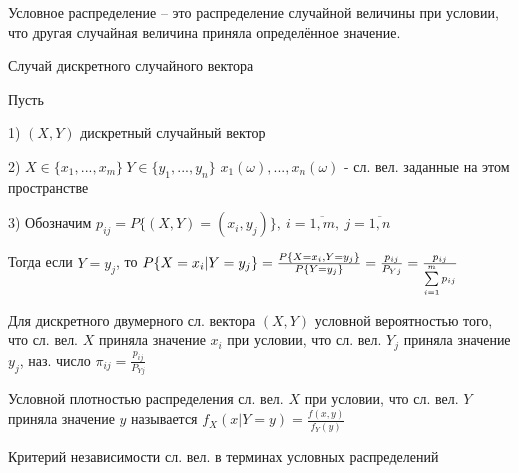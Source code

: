 
\OPR Условное распределение – это распределение случайной величины при условии, что другая
случайная величина приняла определённое значение.

Случай дискретного случайного вектора 

Пусть

1) $(X,Y)$ дискретный случайный вектор

2) $X\in\{x_1,...,x_m\}~Y\in\{y_1,...,y_n\}$
$x_1(\omega),...,x_n(\omega)$ - сл. вел. заданные на этом пространстве

3) Обозначим $p_{ij}=P\{(X,Y)=(x_i,y_j)\},~i=\overline{1,m},~j=\overline{1,n}$

Тогда если $Y=y_j$, то $P\{X=x_i|Y=y_j\}=\tfrac{P\{X=x_i,Y=y_j\}}{P\{Y=y_j\}}=\tfrac{p_{ij}}{P_{Yj}}=\tfrac{p_{ij}}{\sum\limits_{i=1}^{m}p_{ij}}$

\OPR Для дискретного двумерного сл. вектора $(X,Y)$ условной вероятностью того, что сл. вел. $X$ приняла значение $x_i$ при условии, что сл. вел. $Y_j$ приняла значение $y_j$, наз. число $\pi_{ij}=\tfrac{p_{ij}}{P_{Yj}}$

\OPR Условной плотностью распределения сл. вел. $X$ при условии, что сл. вел. $Y$ приняла значение $y$ называется $f_X(x|Y=y)=\tfrac{f(x,y)}{f_Y(y)}$

\THRM Критерий независимости сл. вел. в терминах условных распределений

